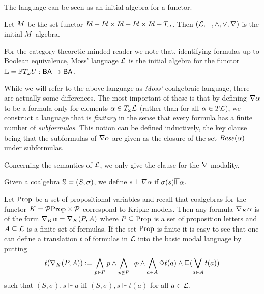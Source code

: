 \documentclass{book}
\begin{document}
The language can be seen as an initial algebra for a functor.

\begin{proposition}
\label{p:mossinit}
Let $M$ be the set functor $\mathit{Id} + \mathit{Id}\times\mathit{Id} +
\mathit{Id}\times\mathit{Id} + T_{\omega}$.  Then
$(\mathcal{L},\neg,\wedge,\vee,\nabla)$ is the initial
$M$-algebra.
\end{proposition}

\begin{remark}\label{rmk:moss-lang-fun} 
  For the category theoretic minded reader we note that,
  identifying formulas up to Boolean equivalence, Moss' language
  $\mathcal{L}$ is the initial algebra for the functor
  ${\mathbb{L}}=\mathbb{F}T_\omega U: \mathsf{BA} \to \mathsf{BA}$.
\end{remark}

While we will refer to the above language as \emph{Moss'} coalgebraic
language, there are actually some differences.  The most important of
these is that by defining $\nabla\alpha$ to be a formula only for
elements $\alpha \in T_{\omega}\mathcal{L}$ (rather than for all $\alpha
\in T\mathcal{L}$), we construct a language that is \emph{finitary}
in the sense that every formula has a finite number of
\emph{subformulas}.  This notion can be defined inductively, the key
clause being that the subformulas of $\nabla\alpha$ are given as the
closure of the set $\mathit{Base}(\alpha)$ under subformulas.

Concerning the semantics of $\mathcal{L}$, we only give the clause for
the $\nabla$ modality.

\begin{definition}\label{def:Lang-sem}
Given a coalgebra $\mathbb{S}=(S,\sigma)$, we define $s\Vdash\nabla\alpha$
if
$\sigma(s)\overline{\Vdash}\alpha$.
\end{definition}

\begin{example}
Let $\mathrm{Prop}$ be a set of propositional variables and recall 
that coalgebras for the functor $K = \mathcal{P} \mathrm{Prop} \times \mathcal{P}$
correspond to Kripke models.  Then any formula $\nabla_{K} \alpha$ is
of the form $\nabla_{K}\alpha=\nabla_{K}(P,A)$ where $P\subseteq
\mathrm{Prop}$ is a set of proposition letters and $A \subseteq \mathcal{L}$ is
a finite set of formulas.  If the set $\mathrm{Prop}$ is finite it is easy to
see that one can define a translation $t$ of formulas in $\mathcal{L}$
into the basic modal language by putting
\[ t(\nabla_{K} (P,A)) \mathrel{:=}
\bigwedge_{p \in P} p \wedge \bigwedge_{p \notin P} \neg p
\wedge \bigwedge_{a \in A} \Diamond t(a) \wedge \Box (\bigvee_{a \in A} t(a))
\]
such that $(S,\sigma),s \Vdash a$ iff $(S,\sigma),s \Vdash t(a)$ for all $a
\in \mathcal{L}$.
\end{example}
\end{document}
